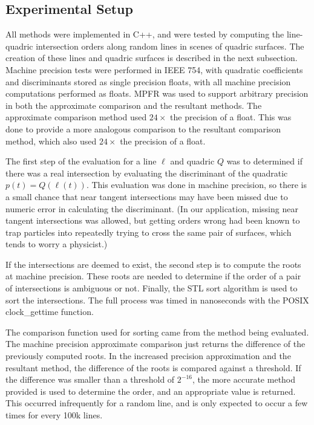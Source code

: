 \documentclass{cccg16}
\begin{document}
\subsection{Experimental Setup}
All methods were implemented in C++\cite{mfdeakin_2016_57108}, and
were tested by computing the line-quadric intersection orders along
random lines in scenes of quadric surfaces. The creation of these
lines and quadric surfaces is described in the next subsection.
Machine precision tests were performed in IEEE 754, with quadratic
coefficients and discriminants stored as single precision floats, with
all machine precision computations performed as floats.
MPFR\cite{mpfr} was used to support arbitrary precision in both the
approximate comparison and the resultant methods.  The approximate
comparison method used $24\times$ the precision of a float.  This was
done to provide a more analogous comparison to the resultant
comparison method, which also used $24\times$ the precision of a
float.

The first step of the evaluation for a line $\ell$ and quadric $Q$ was
to determined if there was a real intersection by evaluating the
discriminant of the quadratic~$p(t)=Q(\ell(t))$.  This evaluation was
done in machine precision, so there is a small chance that near
tangent intersections may have been missed due to numeric error in
calculating the discriminant. (In our application, missing near
tangent intersections was allowed, but getting orders wrong had been
known to trap particles into repeatedly trying to cross the same pair
of surfaces, which tends to worry a physicist.)

If the intersections are deemed to exist, the second step is to
compute the roots at machine precision.  These roots are needed to
determine if the order of a pair of intersections is ambiguous or not.
Finally, the STL sort algorithm is used to sort the intersections.
The full process was timed in nanoseconds with the POSIX
clock\_gettime function.

The comparison function used for sorting came from the method being
evaluated.  The machine precision approximate comparison just returns
the difference of the previously computed roots.  In the increased
precision approximation and the resultant method, the difference of
the roots is compared against a threshold.  If the difference was
smaller than a threshold of $2^{-16}$, the more accurate method
provided is used to determine the order, and an appropriate value is
returned.  This occurred infrequently for a random line, and is only
expected to occur a few times for every 100k lines.
\end{document}
